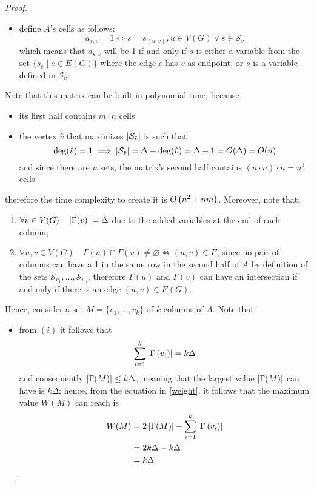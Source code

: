 \begin{proof}
\begin{itemize}
        \item define $A$'s cells as follows: $$a_{s, v} = 1 \iff s = s_{(u, v)}, u \in V(G) \lor s \in \mathcal S_v$$ which means that $a_{s, v}$ will be 1 if and only if $s$ is either a variable from the set $\{s_e \mid e \in E(G)\}$ where the edge $e$ has $v$ as endpoint, or $s$ is a variable defined in $\mathcal S_v$.
    \end{itemize}

    Note that this matrix can be built in polynomial time, because

    \begin{itemize}
        \item its first half contains $m \cdot n$ cells
        \item the vertex $\hat v$ that maximizes $\left|\mathcal S_{\hat v}\right|$ is such that $$\deg(\hat v) = 1 \implies \left|\mathcal S_{\hat v}\right| = \Delta - \deg(\hat v) = \Delta - 1 = O(\Delta) = O(n)$$ and since there are $n$ sets, the matrix's second half contains $(n \cdot n) \cdot n = n^3$ cells
    \end{itemize}

    therefore the time complexity to create it is $O \left(n^2 + nm\right)$. Moreover, note that:

    \begin{enumerate}[label=\roman*), font=\itshape]
        \item $\forall v \in V(G) \quad \left|\Gamma(v)\right| = \Delta$ due to the added variables at the end of each column;
        \item $\forall u, v \in V(G) \quad \Gamma(u) \cap \Gamma(v) \neq \varnothing \iff (u, v) \in E$, since no pair of columns can have a 1 in the same row in the second half of $A$ by definition of the sets $\mathcal S_{v_1}, \ldots , \mathcal S_{v_n}$, therefore $\Gamma(u)$ and $\Gamma(v)$ can have an intersection if and only if there is an edge $(u, v) \in E(G)$.
    \end{enumerate}

    Hence, consider a set $M = \{v_1, \ldots, v_k\}$ of $k$ columns of $A$. Note that:

    \begin{itemize}
        \item from $(i)$ it follows that $$\sum_{i = 1}^k {\left|\Gamma \left(v_i\right)\right|} = k \Delta$$ and consequently $\left|\Gamma(M)\right| \le k \Delta$, meaning that the largest value $\left|\Gamma(M)\right|$ can have is $k \Delta$; hence, from the equation in \cref{weight}, it follows that the maximum value $W(M)$ can reach is
            \begin{equation*}
                \begin{split}
                    W(M) & = 2 \left|\Gamma(M)\right| - \sum_{i = 1}^k{\left|\Gamma \left(v_i\right)\right|} \\
                         & = 2 k \Delta - k \Delta \\
                         & = k \Delta
                \end{split}
            \end{equation*}


\end{itemize}
\end{proof}
